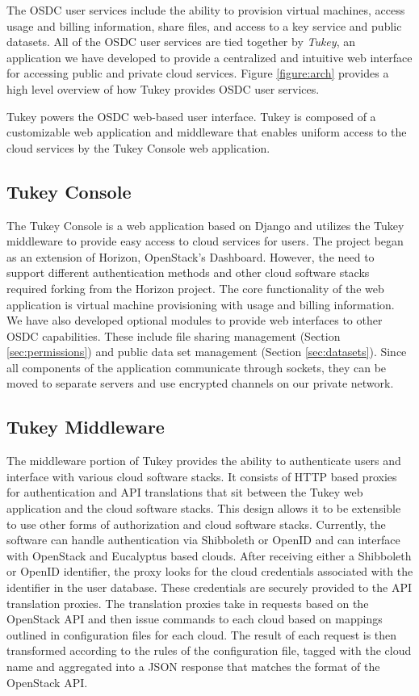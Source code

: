 \documentclass[11pt,twocolumn]{article}
\begin{document}
The OSDC user services include the ability to provision virtual
machines, access usage and billing information, share files, and
access to a key service and public datasets. All of the OSDC user
services are tied together by \emph{Tukey}, an application we have
developed to provide a centralized and intuitive web interface for
accessing public and private cloud services. Figure \ref{figure:arch}
provides a high level overview of how Tukey provides OSDC user
services.

Tukey powers the OSDC web-based user interface. Tukey is composed of a
customizable web application and middleware that enables uniform
access to the cloud services by the Tukey Console web application.

\subsection{Tukey Console}
The Tukey Console is a web application based on Django and utilizes
the Tukey middleware to provide easy access to cloud services for
users. The project began as an extension of Horizon, OpenStack's
Dashboard. However, the need to support different authentication
methods and other cloud software stacks required forking from the
Horizon project. The core functionality of the web application is
virtual machine provisioning with usage and billing information. We
have also developed optional modules to provide web interfaces to
other OSDC capabilities. These include file sharing management
(Section \ref{sec:permissions}) and public data set management
(Section \ref{sec:datasets}).  Since all components of the application
communicate through sockets, they can be moved to separate servers and
use encrypted channels on our private network.

\subsection{Tukey Middleware}
The middleware portion of Tukey provides the ability to authenticate
users and interface with various cloud software stacks. It consists of
HTTP based proxies for authentication and API translations that sit
between the Tukey web application and the cloud software stacks. This
design allows it to be extensible to use other forms of authorization
and cloud software stacks. Currently, the software can handle
authentication via Shibboleth or OpenID and can interface with
OpenStack and Eucalyptus based clouds. After receiving either a
Shibboleth or OpenID identifier, the proxy looks for the cloud
credentials associated with the identifier in the user database. These
credentials are securely provided to the API translation proxies. The
translation proxies take in requests based on the OpenStack API and
then issue commands to each cloud based on mappings outlined in
configuration files for each cloud. The result of each request is then
transformed according to the rules of the configuration file, tagged
with the cloud name and aggregated into a JSON response that matches
the format of the OpenStack API.
\end{document}
